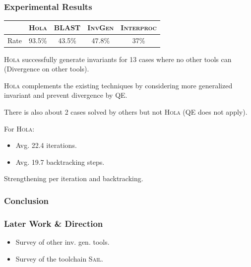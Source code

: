 \documentclass[11pt]{beamer}
\begin{document}
\begin{frame}\frametitle{Experimental Results}

\begin{center}
\begin{tabular}{c|c|c|c|c}
\hline 
 & \textsc{Hola} & \textsc{BLAST} & \textsc{InvGen} & \textsc{Interproc}\\
 \hline
Rate & 93.5\%&43.5\% &47.8\% &37\%\\
\hline
\end{tabular}
\end{center}

\textsc{Hola} successfully generate invariants for 13 cases where no other tools can (Divergence on other tools).

\textsc{Hola} complements the existing techniques by considering more generalized invariant and prevent divergence by QE.

There is also about 2 cases solved by others but not \textsc{Hola} (QE does not apply).

For \textsc{Hola}:
\begin{itemize}
\item Avg. 22.4 iterations.
\item Avg. 19.7 backtracking steps.

\end{itemize}
Strengthening per iteration and backtracking.

\end{frame}

\begin{frame}\frametitle{Conclusion}

\end{frame}

\begin{frame}\frametitle{Later Work \& Direction}

\begin{itemize}
\item Survey of other inv. gen. tools.
\item Survey of the toolchain \textsc{Sail}.
\end{itemize}
\end{frame}
\end{document}
